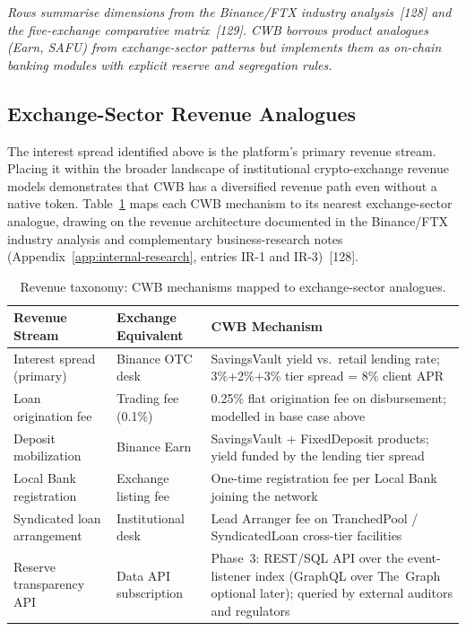 \documentclass[12pt,a4paper]{report}
\newcommand{\tableheadcolor}{\rowcolor{TableHeadBg}}
\begin{document}
\vspace{2pt}
\noindent\textit{\small Rows summarise dimensions from the Binance/FTX industry analysis~[128] and the five-exchange comparative matrix~[129]. CWB borrows \textit{product analogues} (Earn, SAFU) from exchange-sector patterns but implements them as on-chain banking modules with explicit reserve and segregation rules.}

\subsection{Exchange-Sector Revenue Analogues}
\label{sec:revenue-analogues}

\noindent The interest spread identified above is the platform's primary revenue stream. Placing it within the broader landscape of institutional crypto-exchange revenue models demonstrates that CWB has a diversified revenue path even without a native token. Table~\ref{tab:revenue-taxonomy} maps each CWB mechanism to its nearest exchange-sector analogue, drawing on the revenue architecture documented in the Binance/FTX industry analysis and complementary business-research notes (Appendix~\ref{app:internal-research}, entries IR-1 and IR-3)~[128].

\begin{table}[H]
\centering
\caption[Revenue taxonomy vs.\ exchange analogues]{Revenue taxonomy: CWB mechanisms mapped to exchange-sector analogues.}
\label{tab:revenue-taxonomy}
\begin{tabular}{p{3.8cm}p{3.8cm}p{5.6cm}}
\toprule
\tableheadcolor
\textbf{Revenue Stream} & \textbf{Exchange Equivalent} & \textbf{CWB Mechanism} \\
\midrule
Interest spread (primary) & Binance OTC desk & SavingsVault yield vs.\ retail lending rate; 3\%+2\%+3\% tier spread = 8\% client APR \\
Loan origination fee & Trading fee (0.1\%) & 0.25\% flat origination fee on disbursement; modelled in base case above \\
Deposit mobilization & Binance Earn & SavingsVault + FixedDeposit products; yield funded by the lending tier spread \\
Local Bank registration & Exchange listing fee & One-time registration fee per Local Bank joining the network \\
Syndicated loan arrangement & Institutional desk & Lead Arranger fee on TranchedPool / SyndicatedLoan cross-tier facilities \\
Reserve transparency API & Data API subscription & Phase~3: REST/SQL API over the event-listener index (GraphQL over The~Graph optional later); queried by external auditors and regulators \\
\bottomrule
\end{tabular}
\end{table}
\end{document}
